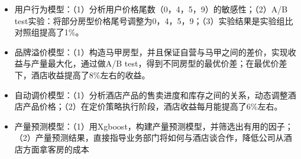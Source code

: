 \documentclass{resume}
\begin{document}
\begin{onehalfspacing}
\begin{itemize}
  \item 用户行为模型：（1）分析用户价格尾数（0，4，5，9）的敏感性；（2）A/B test实验：将部分房型价格尾号调整为0，4，5，9；（3）实验结果是实验组比对照组提高了1\%。
  \item 品牌溢价模型：（1）构造马甲房型，并且保证自营与马甲之间的差价，实现收益与产量最大化，通过做A/B test，得到不同房型的最优价差；在最优价差下，酒店收益提高了8\%左右的收益。
  \item 自动调价模型：（1）分析酒店产品的售卖进度和库存之间的关系，动态调整酒店产品价格；（2）在定价策略执行阶段，酒店收益每月能提高了6\%左右。
  \item 产量预测模型：（1）用Xgboost，构建产量预测模型，并筛选出有用的因子；（2）产量预测结果，直接指导业务部门将如何与酒店谈合作，降低公司从酒店方面拿客房的成本
\end{itemize}
\end{onehalfspacing}


\end{document}
